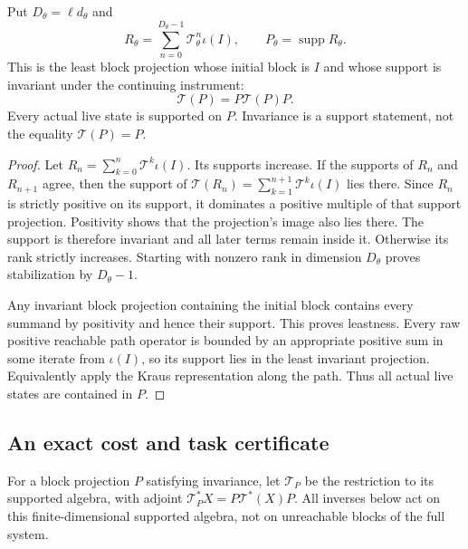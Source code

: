 \begin{lemma}\label{lem:reachable-support}
Put $D_\theta=\ell d_\theta$ and
\begin{equation}\label{eq:reachable-Gram}
 R_\theta=\sum_{n=0}^{D_\theta-1}\mathcal T_\theta^n\iota(I),\qquad
 P_\theta=\operatorname{supp}R_\theta.
\end{equation}
This is the least block projection whose initial block is $I$ and whose support is invariant under the continuing instrument:
\begin{equation}\label{eq:support-invariant}
 \mathcal T(P)=P\mathcal T(P)P.
\end{equation}
Every actual live state is supported on $P$. Invariance is a support statement, not the equality $\mathcal T(P)=P$.
\end{lemma}
\begin{proof}
Let $R_n=\sum_{k=0}^n\mathcal T^k\iota(I)$. Its supports increase. If the supports of $R_n$ and $R_{n+1}$ agree, then the support of $\mathcal T(R_n)=\sum_{k=1}^{n+1}\mathcal T^k\iota(I)$ lies there. Since $R_n$ is strictly positive on its support, it dominates a positive multiple of that support projection. Positivity shows that the projection's image also lies there. The support is therefore invariant and all later terms remain inside it. Otherwise its rank strictly increases. Starting with nonzero rank in dimension $D_\theta$ proves stabilization by $D_\theta-1$.

Any invariant block projection containing the initial block contains every summand by positivity and hence their support. This proves leastness. Every raw positive reachable path operator is bounded by an appropriate positive sum in some iterate from $\iota(I)$, so its support lies in the least invariant projection. Equivalently apply the Kraus representation along the path. Thus all actual live states are contained in $P$.
\end{proof}

\subsection{An exact cost and task certificate}
For a block projection $P$ satisfying invariance, let $\mathcal T_P$ be the restriction to its supported algebra, with adjoint $\mathcal T_P^*X=P\mathcal T^*(X)P$. All inverses below act on this finite-dimensional supported algebra, not on unreachable blocks of the full system.

